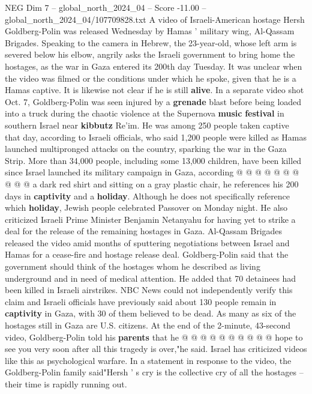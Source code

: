 \begin{textsample}{NEG Dim 7 – global\_north\_2024\_04 – Score -11.00 – global\_north\_2024\_04/107709828.txt}  \label{ex:f7_neg_222}
A video of Israeli-American hostage Hersh Goldberg-Polin was released Wednesday by Hamas ' military wing, Al-Qassam Brigades.
Speaking to the camera in Hebrew, the 23-year-old, whose left arm is severed below his elbow, angrily asks the Israeli government to bring home the hostages, as the war in Gaza entered its 200th day Tuesday.
It was unclear when the video was filmed or the conditions under which he spoke, given that he is a Hamas captive.
It is likewise not clear if he is still \textbf{alive}.
In a separate video shot Oct. 7, Goldberg-Polin was seen injured by a \textbf{grenade} blast before being loaded into a truck during the chaotic violence at the Supernova \textbf{music} \textbf{festival} in southern Israel near \textbf{kibbutz} Re'im.
He was among 250 people taken captive that day, according to Israeli officials, who said 1,200 people were killed as Hamas launched multipronged attacks on the country, sparking the war in the Gaza Strip.
More than 34,000 people, including some 13,000 children, have been killed since Israel launched its military campaign in Gaza, according @ @ @ @ @ @ @ @ @ @ a dark red shirt and sitting on a gray plastic chair, he references his 200 days in \textbf{captivity} and a \textbf{holiday}.
Although he does not specifically reference which \textbf{holiday}, Jewish people celebrated Passover on Monday night.
He also criticized Israeli Prime Minister Benjamin Netanyahu for having yet to strike a deal for the release of the remaining hostages in Gaza.
Al-Qassam Brigades released the video amid months of sputtering negotiations between Israel and Hamas for a cease-fire and hostage release deal.
Goldberg-Polin said that the government should think of the hostages whom he described as living underground and in need of medical attention.
He added that 70 detainees had been killed in Israeli airstrikes.
NBC News could not independently verify this claim and Israeli officials have previously said about 130 people remain in \textbf{captivity} in Gaza, with 30 of them believed to be dead.
As many as six of the hostages still in Gaza are U.S. citizens.
At the end of the 2-minute, 43-second video, Goldberg-Polin told his \textbf{parents} that he @ @ @ @ @ @ @ @ @ @ hope to see you very soon after all this tragedy is over,"he said.
Israel has criticized videos like this as psychological warfare.
In a statement in response to the video, the Goldberg-Polin family said"Hersh ' s cry is the collective cry of all the hostages -- their time is rapidly running out.

\end{textsample}
